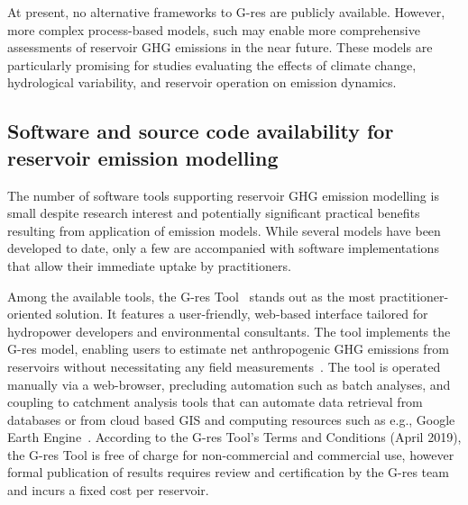 \documentclass[final,1p,times]{elsarticle}
\begin{document}
At present, no alternative frameworks to G-res are publicly available. 
However, more complex process-based models, such \citet{SHI2025} may enable more comprehensive assessments of reservoir \ac{GHG} emissions in the near future. 
These models are particularly promising for studies evaluating the effects of climate change, hydrological variability, and reservoir operation on emission dynamics.


\subsection{Software and source code availability for reservoir emission modelling}
\label{subsec:software_and_code}

The number of software tools supporting reservoir \ac{GHG} emission modelling is small despite research interest and potentially significant practical benefits resulting from application of emission models. %
While several models have been developed to date, only a few are accompanied with software implementations that allow their immediate uptake by practitioners.

Among the available tools, the G-res Tool~\citep{prairie2017gres, Prairie2017b} stands out as the most practitioner-oriented solution. 
It features a user-friendly, web-based interface tailored for hydropower developers and environmental consultants. 
The tool implements the G-res model, enabling users to estimate net anthropogenic \ac{GHG} emissions from reservoirs without necessitating any field measurements~\citep{Prairie2021}. 
The tool is operated manually via a web-browser, precluding automation such as batch analyses, and coupling to catchment analysis tools that can automate data retrieval from databases or from cloud based \ac{GIS} and computing resources such as e.g., Google Earth Engine~\cite{Gorelick2017}.
According to the G-res Tool's Terms and Conditions (April 2019), the G-res Tool is free of charge for  non-commercial and commercial use, however formal publication of results requires review and certification by the G-res team and incurs a fixed cost per reservoir.
\end{document}
